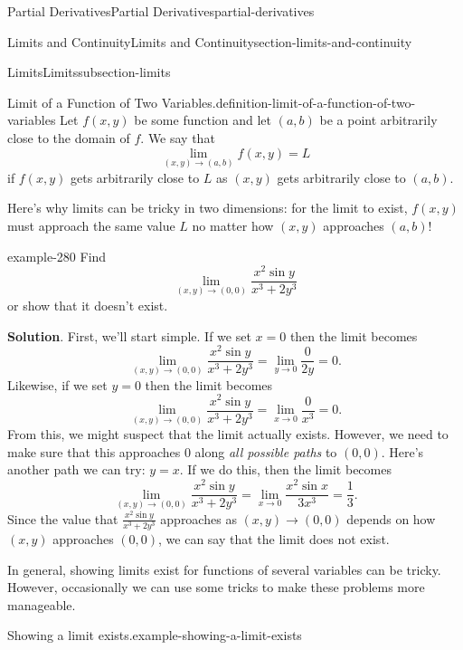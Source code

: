 \documentclass[oneside,10pt,]{book}
\numberwithin{equation}{section}
\begin{document}
\begin{chapterptx}{Partial Derivatives}{}{Partial Derivatives}{}{}{partial-derivatives}
\begin{sectionptx}{Limits and Continuity}{}{Limits and Continuity}{}{}{section-limits-and-continuity}
\begin{subsectionptx}{Limits}{}{Limits}{}{}{subsection-limits}
\begin{definition}{Limit of a Function of Two Variables.}{definition-limit-of-a-function-of-two-variables}
\hypertarget{p-1343}{}%
Let \(f(x,y)\) be some function and let \((a,b)\) be a point arbitrarily close to the domain of \(f\). We say that%
\begin{equation*}
\lim_{(x,y)\to(a,b)}f(x,y) = L
\end{equation*}
if \(f(x,y)\) gets arbitrarily close to \(L\) as \((x,y)\) gets arbitrarily close to \((a,b)\).%
\end{definition}
\hypertarget{p-1344}{}%
Here's why limits can be tricky in two dimensions: for the limit to exist, \(f(x,y)\) must approach the same value \(L\) no matter how \((x,y)\) approaches \((a,b)\)!%
\begin{example}{}{example-280}%
\hypertarget{p-1345}{}%
Find%
\begin{equation*}
\lim_{(x,y)\to(0,0)}\frac{x^{2}\sin y}{x^{3}+2y^{3}}
\end{equation*}
or show that it doesn't exist.%
\par\smallskip%
\noindent\textbf{Solution}.\hypertarget{solution-214}{}\quad%
\hypertarget{p-1346}{}%
First, we'll start simple. If we set \(x = 0\) then the limit becomes%
\begin{equation*}
\lim_{(x,y)\to(0,0)}\frac{x^{2}\sin y}{x^{3}+2y^{3}} = \lim_{y\to0}\frac{0}{2y} = 0.
\end{equation*}
Likewise, if we set \(y=0\) then the limit becomes%
\begin{equation*}
\lim_{(x,y)\to(0,0)}\frac{x^{2}\sin y}{x^{3}+2y^{3}} = \lim_{x\to0}\frac{0}{x^{3}} = 0.
\end{equation*}
From this, we might suspect that the limit actually exists. However, we need to make sure that this approaches \(0\) along \emph{all possible paths} to \((0,0)\). Here's another path we can try: \(y = x\). If we do this, then the limit becomes%
\begin{equation*}
\lim_{(x,y)\to(0,0)}\frac{x^{2}\sin y}{x^{3}+2y^{3}} = \lim_{x\to0}\frac{x^{2}\sin x}{3x^{3}} = \frac{1}{3}.
\end{equation*}
Since the value that \(\frac{x^{2}\sin y}{x^{3}+2y^{3}}\) approaches as \((x,y)\to(0,0)\) depends on how \((x,y)\) approaches \((0,0)\), we can say that the limit does not exist.%
\end{example}
\hypertarget{p-1347}{}%
In general, showing limits exist for functions of several variables can be tricky. However, occasionally we can use some tricks to make these problems more manageable.%
\begin{example}{Showing a limit exists.}{example-showing-a-limit-exists}%

\end{example}
\end{subsectionptx}
\end{sectionptx}
\end{chapterptx}
\end{document}
